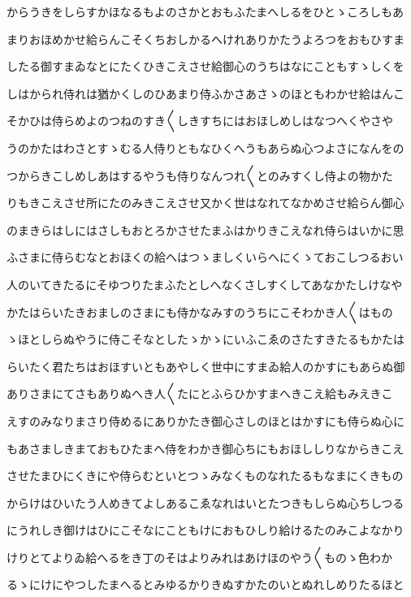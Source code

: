 \documentclass[a4paper,11pt,landscape]{ltjtarticle}
\begin{document}
からうきをしらすかほなるもよのさかとおもふたまへしるをひとゝころしもあ
\par\medskip
まりおほめかせ給らんこそくちおしかるへけれありかたうよろつをおもひすま
\par\medskip
したる御すまゐなとにたくひきこえさせ給御心のうちはなにこともすゝしくを
\par\medskip
しはかられ侍れは猶かくしのひあまり侍ふかさあさゝのほともわかせ給はんこ
\par\medskip
そかひは侍らめよのつねのすき〱しきすちにはおほしめしはなつへくやさや
\par\medskip
うのかたはわさとすゝむる人侍りともなひくへうもあらぬ心つよさになんをの
\par\medskip
つからきこしめしあはするやうも侍りなんつれ〱とのみすくし侍よの物かた
\par\medskip
りもきこえさせ所にたのみきこえさせ又かく世はなれてなかめさせ給らん御心
\par\medskip
のまきらはしにはさしもおとろかさせたまふはかりきこえなれ侍らはいかに思
\par\medskip
ふさまに侍らむなとおほくの給へはつゝましくいらへにくゝておこしつるおい
\par\medskip
人のいてきたるにそゆつりたまふたとしへなくさしすくしてあなかたしけなや
\par\medskip
かたはらいたきおましのさまにも侍かなみすのうちにこそわかき人〱はもの
\par\medskip
ゝほとしらぬやうに侍こそなとしたゝかゝにいふこゑのさたすきたるもかたは
\par\medskip
らいたく君たちはおほすいともあやしく世中にすまゐ給人のかすにもあらぬ御
\par\medskip
ありさまにてさもありぬへき人〱たにとふらひかすまへきこえ給もみえきこ
\par\medskip
えすのみなりまさり侍めるにありかたき御心さしのほとはかすにも侍らぬ心に
\par\medskip
もあさましきまておもひたまへ侍をわかき御心ちにもおほししりなからきこえ
\par\medskip
させたまひにくきにや侍らむといとつゝみなくものなれたるもなまにくきもの
\par\medskip
からけはひいたう人めきてよしあるこゑなれはいとたつきもしらぬ心ちしつる
\par\medskip
にうれしき御けはひにこそなにこともけにおもひしり給けるたのみこよなかり
\par\medskip
けりとてよりゐ給へるをき丁のそはよりみれはあけほのやう〱ものゝ色わか
\par\medskip
るゝにけにやつしたまへるとみゆるかりきぬすかたのいとぬれしめりたるほと
\end{document}
